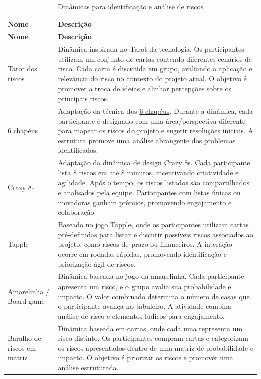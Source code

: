 \documentclass[
	12pt,
	openright,
	twoside,
	a4paper,
	english,
	brazil
	]{abntex2}
\begin{document}
\begin{longtable}{|p{3cm}|p{12cm}|}
  \caption{Dinâmicas para identificação e análise de riscos} \label{tab:dinamicas} \\ \hline
  \textbf{Nome} & \textbf{Descrição} \\ \hline
  \endfirsthead
  \hline
  \textbf{Nome} & \textbf{Descrição} \\ \hline
  \endhead
  \hline
  \endfoot
  \endlastfoot
  Tarot dos riscos & Dinâmica inspirada no Tarot da tecnologia. Os participantes utilizam um conjunto de cartas contendo diferentes cenários de risco. Cada carta é discutida em grupo, avaliando a aplicação e relevância do risco no contexto do projeto atual. O objetivo é promover a troca de ideias e alinhar percepções sobre os principais riscos. \\ \hline
  6 chapéus & Adaptação da técnica dos \href{https://brasil.uxdesign.cc/escolhendo-ferramentas-six-thinking-hats-2e30da00ec9b}{6 chapéus}. Durante a dinâmica, cada participante é designado com uma área/perspectiva diferente para mapear os riscos do projeto e sugerir resoluções iniciais. A estrutura promove uma análise abrangente dos problemas identificados. \\ \hline
  Crazy 8s & Adaptação da dinâmica de design \href{https://laboratoriobridge.github.io/bthinking/pt/methods/crazy8/}{Crazy 8s}. Cada participante lista 8 riscos em até 8 minutos, incentivando criatividade e agilidade. Após o tempo, os riscos listados são compartilhados e analisados pela equipe. Participantes com listas únicas ou inovadoras ganham prêmios, promovendo engajamento e colaboração. \\ \hline
  Tapple & Baseado no jogo \href{https://ludopedia.com.br/jogo/tapple}{Tapple}, onde os participantes utilizam cartas pré-definidas para listar e discutir possíveis riscos associados ao projeto, como riscos de prazo ou financeiros. A interação ocorre em rodadas rápidas, promovendo identificação e priorização ágil de riscos. \\ \hline
  Amarelinha / Board game & Dinâmica baseada no jogo da amarelinha. Cada participante apresenta um risco, e o grupo avalia sua probabilidade e impacto. O valor combinado determina o número de casas que o participante avança no tabuleiro. A atividade combina análise de risco e elementos lúdicos para engajamento. \\ \hline
  Baralho de riscos em matriz & Dinâmica baseada em cartas, onde cada uma representa um risco distinto. Os participantes compram cartas e categorizam os riscos apresentados dentro de uma matriz de probabilidade e impacto. O objetivo é priorizar os riscos e promover uma análise estruturada. \\ \hline

\end{longtable}
\end{document}
